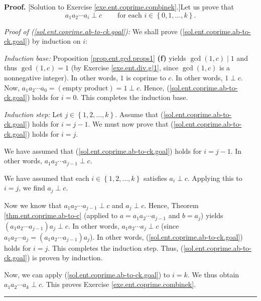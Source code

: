 \documentclass[numbers=enddot,12pt,final,onecolumn,notitlepage]{scrartcl}%
\numberwithin{exer}{subsection}
\theoremstyle{definition}
\newenvironment{fineprint}{\begin{small}}{\end{small}}
\newenvironment{proof}[1][Proof]{\noindent\textbf{#1.} }{\ \rule{0.5em}{0.5em}}
\begin{document}
\begin{fineprint}
\begin{proof}
[Solution to Exercise \ref{exe.ent.coprime.combinek}.]Let us prove that%
\begin{equation}
a_{1}a_{2}\cdots a_{i}\perp c\ \ \ \ \ \ \ \ \ \ \text{for each }i\in\left\{
0,1,\ldots,k\right\}  . \label{sol.ent.coprime.ab-to-ck.goal}%
\end{equation}


\textit{Proof of (\ref{sol.ent.coprime.ab-to-ck.goal}):} We shall prove
(\ref{sol.ent.coprime.ab-to-ck.goal}) by induction on $i$:

\textit{Induction base:} Proposition \ref{prop.ent.gcd.props1} \textbf{(f)}
yields $\gcd\left(  1,c\right)  \mid1$ and thus $\gcd\left(  1,c\right)  =1$
(by Exercise \ref{exe.ent.div.g|1}, since $\gcd\left(  1,c\right)  $ is a
nonnegative integer). In other words, $1$ is coprime to $c$. In other words,
$1\perp c$. Now, $a_{1}a_{2}\cdots a_{0}=\left(  \text{empty product}\right)
=1\perp c$. Hence, (\ref{sol.ent.coprime.ab-to-ck.goal}) holds for $i=0$. This
completes the induction base.

\textit{Induction step:} Let $j\in\left\{  1,2,\ldots,k\right\}  $. Assume
that (\ref{sol.ent.coprime.ab-to-ck.goal}) holds for $i=j-1$. We must now
prove that (\ref{sol.ent.coprime.ab-to-ck.goal}) holds for $i=j$.

We have assumed that (\ref{sol.ent.coprime.ab-to-ck.goal}) holds for $i=j-1$.
In other words, $a_{1}a_{2}\cdots a_{j-1}\perp c$.

We have assumed that each $i\in\left\{  1,2,\ldots,k\right\}  $ satisfies
$a_{i}\perp c$. Applying this to $i=j$, we find $a_{j}\perp c$.

Now we know that $a_{1}a_{2}\cdots a_{j-1}\perp c$ and $a_{j}\perp c$. Hence,
Theorem \ref{thm.ent.coprime.ab-to-c} (applied to $a=a_{1}a_{2}\cdots a_{j-1}$
and $b=a_{j}$) yields $\left(  a_{1}a_{2}\cdots a_{j-1}\right)  a_{j}\perp c$.
In other words, $a_{1}a_{2}\cdots a_{j}\perp c$ (since $a_{1}a_{2}\cdots
a_{j}=\left(  a_{1}a_{2}\cdots a_{j-1}\right)  a_{j}$). In other words,
(\ref{sol.ent.coprime.ab-to-ck.goal}) holds for $i=j$. This completes the
induction step. Thus, (\ref{sol.ent.coprime.ab-to-ck.goal}) is proven by induction.

Now, we can apply (\ref{sol.ent.coprime.ab-to-ck.goal}) to $i=k$. We thus
obtain $a_{1}a_{2}\cdots a_{k}\perp c$. This proves Exercise
\ref{exe.ent.coprime.combinek}.
\end{proof}
\end{fineprint}
\end{document}
